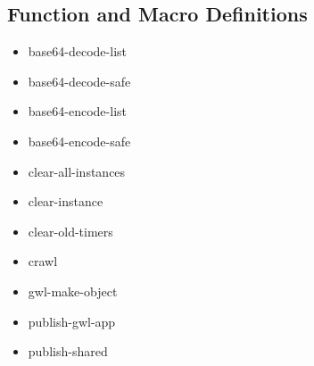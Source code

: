 \documentclass [11pt]{book}
\begin{document}
\subsection{Function and Macro Definitions}

\label{subsec:functionandmacrodefinitions}



\begin{itemize}

\item {}base64-decode-list





\item {}base64-decode-safe





\item {}base64-encode-list





\item {}base64-encode-safe





\item {}clear-all-instances





\item {}clear-instance





\item {}clear-old-timers





\item {}crawl





\item {}gwl-make-object





\item {}publish-gwl-app





\item {}publish-shared






\end{itemize}
\end{document}
